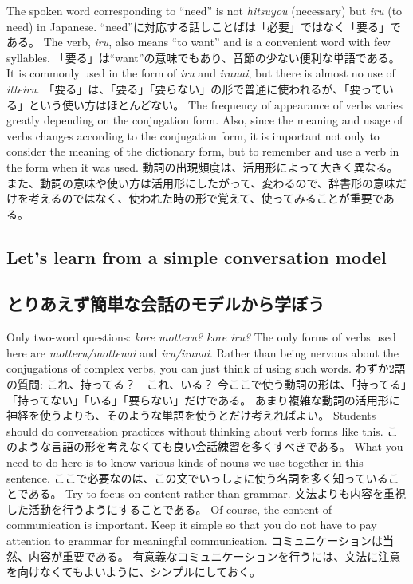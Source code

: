 \documentclass[uplatex,dvipdfmx,b5paper,english,10pt]{jsbook}
\begin{document}
\ifEnglish
The spoken word corresponding to ``need'' is not {\it hitsuyou\/} (necessary) but {\it iru\/} (to need) in Japanese.
\else
  ``need''に対応する話しことばは「必要」ではなく「要る」である。
\fi
\ifEnglish
The verb, {\it iru\/}, also means ``to want'' and is a convenient word with few syllables.
\else
「要る」は``want''の意味でもあり、音節の少ない便利な単語である。
\fi
\ifEnglish
It is commonly used in the form of {\it iru\/} and {\it iranai\/}, but there is almost no use of {\it itteiru\/}.
\else
「要る」は、「要る」「要らない」の形で普通に使われるが、「要っている」という使い方はほとんどない。
\fi
\ifEnglish
The frequency of appearance of verbs varies greatly depending on the conjugation form.
Also, since the meaning and usage of verbs changes according to the conjugation form, it is important not only to consider the meaning of the dictionary form, but to remember and use a verb in the form when it was used.
\else
動詞の出現頻度は、活用形によって大きく異なる。
また、動詞の意味や使い方は活用形にしたがって、変わるので、辞書形の意味だけを考えるのではなく、使われた時の形で覚えて、使ってみることが重要である。
\fi

\ifEnglish
\subsection {Let's learn from a simple conversation model}
\else
\subsection{とりあえず簡単な会話のモデルから学ぼう}
\fi
\ifEnglish
Only two-word questions: {\it kore motteru? kore iru?\/}
The only forms of verbs used here are {\it motteru/mottenai\/} and {\it iru/iranai\/}.
Rather than being nervous about the conjugations of complex verbs, you can just think of using such words.
\else
わずか2語の質問: これ、持ってる？　これ、いる？
今ここで使う動詞の形は、「持ってる」「持ってない」「いる」「要らない」だけである。
あまり複雑な動詞の活用形に神経を使うよりも、そのような単語を使うとだけ考えればよい。
\fi
\ifEnglish
Students should do conversation practices without thinking about verb forms like this.
\else
このような言語の形を考えなくても良い会話練習を多くすべきである。
\fi
\ifEnglish
What you need to do here is to know various kinds of nouns we use together in this sentence.
\else
ここで必要なのは、この文でいっしょに使う名詞を多く知っていることである。
\fi
\ifEnglish
Try to focus on content rather than grammar.
\else
文法よりも内容を重視した活動を行うようにすることである。
\fi
\ifEnglish
Of course, the content of communication is important.
Keep it simple so that you do not have to pay attention to grammar for meaningful communication.
\else
コミュニケーションは当然、内容が重要である。
有意義なコミュニケーションを行うには、文法に注意を向けなくてもよいように、シンプルにしておく。
\fi
\end{document}
